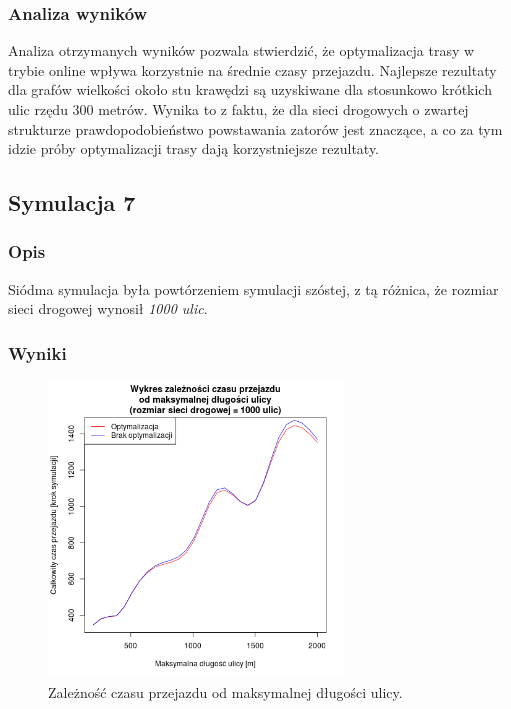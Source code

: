 \documentclass[11pt,a4paper]{article}
\begin{document}
\subsubsection{Analiza wyników}

Analiza otrzymanych wyników pozwala stwierdzić, że optymalizacja trasy w trybie online wpływa korzystnie na średnie czasy przejazdu. Najlepsze rezultaty dla grafów wielkości około stu krawędzi są uzyskiwane dla stosunkowo krótkich ulic rzędu 300 metrów. Wynika to z faktu, że dla sieci drogowych o zwartej strukturze prawdopodobieństwo powstawania zatorów jest znaczące, a co za tym idzie próby optymalizacji trasy dają korzystniejsze rezultaty.

\subsection{Symulacja 7}

\subsubsection{Opis}

Siódma symulacja była powtórzeniem symulacji szóstej, z tą różnica, że rozmiar sieci drogowej wynosił \textit{1000 ulic}.

\subsubsection{Wyniki}



\begin{figure}[H]
	\centering
		\includegraphics[width=0.7\textwidth]{../images/simulation7}
	\caption{Zależność czasu przejazdu od maksymalnej długości ulicy.}
\end{figure}
\end{document}
